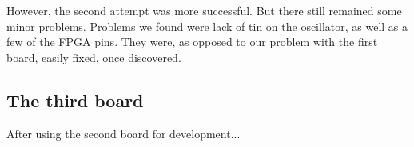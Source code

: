 However, the second attempt was more successful. But there still remained some
minor problems. Problems we found were lack of tin on the oscillator, as well as
a few of the \ac{FPGA} pins. They were, as opposed to our problem with the first
board, easily fixed, once discovered.

\subsection{The third board}
After using the second board for development...
